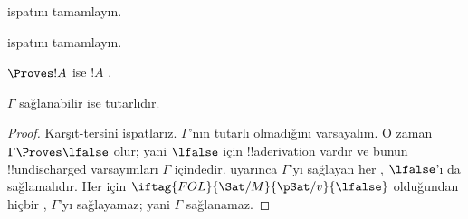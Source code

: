 \documentclass[../../../include/open-logic-section]{subfiles}
\begin{document}
\begin{prob}
 ispatını tamamlayın.
\end{prob}
\tagendprob

\begin{prob}
 ispatını tamamlayın.
\end{prob}
\tagendprob

\begin{cor}
$\Proves !A$ ise $!A$ .
\end{cor}

\begin{cor}
$\Gamma$ sağlanabilir ise tutarlıdır.
\end{cor}

\begin{proof}
Karşıt-tersini ispatlarız. $\Gamma$'nın tutarlı olmadığını varsayalım. O zaman
$\Gamma \Proves \lfalse$ olur; yani $\lfalse$ için !!a{derivation} vardır ve
bunun !!{undischarged} varsayımları $\Gamma$ içindedir.
 uyarınca $\Gamma$'yı sağlayan her
,
$\lfalse$'ı da sağlamalıdır. Her
 için
$\iftag{FOL}{\Sat/{M}}{\pSat/{v}}{\lfalse}$ olduğundan hiçbir
, $\Gamma$'yı sağlayamaz; yani
$\Gamma$ sağlanamaz.
\end{proof}
\end{document}
